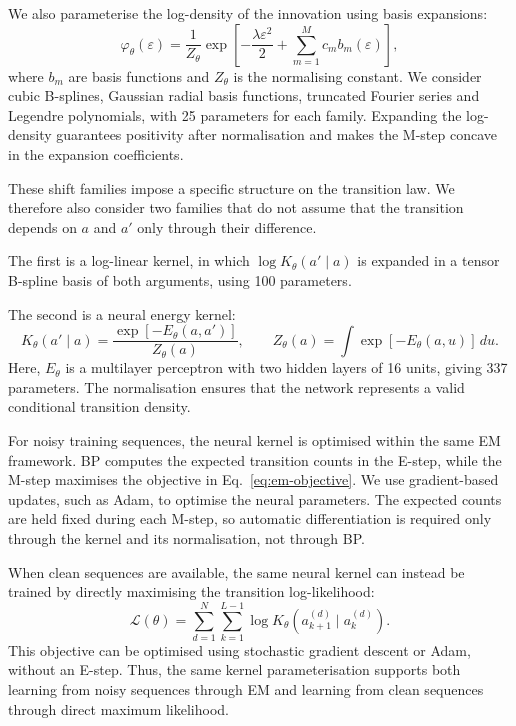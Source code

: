 We also parameterise the log-density of the innovation
using basis expansions:
\begin{equation}
    \varphi_\theta(\varepsilon)
    =
    \frac{1}{Z_\theta}
    \exp\left[
        -\frac{\lambda\varepsilon^2}{2}
        +
        \sum_{m=1}^{M}c_m b_m(\varepsilon)
    \right],
    \label{eq:basis-innovation}
\end{equation}
where $b_m$ are basis functions and $Z_\theta$ is the
normalising constant. We consider cubic B-splines,
Gaussian radial basis functions, truncated Fourier
series and Legendre polynomials, with 25 parameters
for each family. Expanding the log-density guarantees
positivity after normalisation and makes the M-step
concave in the expansion coefficients.

These shift families impose a specific structure on
the transition law. We therefore also consider two
families that do not assume that the transition depends
on $a$ and $a'$ only through their difference.

The first is a log-linear kernel, in which
$\log K_\theta(a'\mid a)$ is expanded in a tensor
B-spline basis of both arguments, using 100 parameters.

The second is a neural energy kernel:
\begin{equation}
    K_\theta(a'\mid a)
    =
    \frac{
        \exp[-E_\theta(a,a')]
    }{
        Z_\theta(a)
    },
    \qquad
    Z_\theta(a)
    =
    \int
    \exp[-E_\theta(a,u)]\,du.
    \label{eq:neural-kernel}
\end{equation}
Here, $E_\theta$ is a multilayer perceptron with two
hidden layers of 16 units, giving 337 parameters.
The normalisation ensures that the network represents
a valid conditional transition density.

For noisy training sequences, the neural kernel is
optimised within the same EM framework. BP computes
the expected transition counts in the E-step, while
the M-step maximises the objective in
Eq.~\eqref{eq:em-objective}. We use gradient-based
updates, such as Adam, to optimise the neural
parameters. The expected counts are held fixed during
each M-step, so automatic differentiation is required
only through the kernel and its normalisation, not
through BP.

When clean sequences are available, the same neural
kernel can instead be trained by directly maximising
the transition log-likelihood:
\begin{equation}
    \mathcal{L}(\theta)
    =
    \sum_{d=1}^{N}
    \sum_{k=1}^{L-1}
    \log K_\theta
    \left(
        a_{k+1}^{(d)}
        \mid a_k^{(d)}
    \right).
    \label{eq:neural-clean-ml}
\end{equation}
This objective can be optimised using stochastic
gradient descent or Adam, without an E-step. Thus,
the same kernel parameterisation supports both
learning from noisy sequences through EM and learning
from clean sequences through direct maximum
likelihood.

